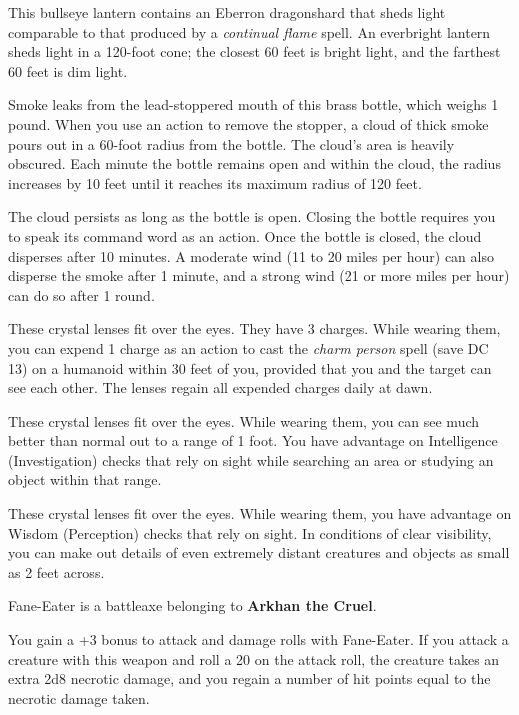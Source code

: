 \documentclass[10pt,a4paper,twoside,bg=print,twocolumn,openany,nodeprecatedcode]{dndbook}
\begin{document}
This bullseye lantern contains an Eberron dragonshard that sheds light comparable to that produced by a \textit{continual flame} spell. An everbright lantern sheds light in a 120-foot cone; the closest 60 feet is bright light, and the farthest 60 feet is dim light.

Smoke leaks from the lead-stoppered mouth of this brass bottle, which weighs 1 pound. When you use an action to remove the stopper, a cloud of thick smoke pours out in a 60-foot radius from the bottle. The cloud's area is heavily obscured. Each minute the bottle remains open and within the cloud, the radius increases by 10 feet until it reaches its maximum radius of 120 feet.

The cloud persists as long as the bottle is open. Closing the bottle requires you to speak its command word as an action. Once the bottle is closed, the cloud disperses after 10 minutes. A moderate wind (11 to 20 miles per hour) can also disperse the smoke after 1 minute, and a strong wind (21 or more miles per hour) can do so after 1 round.

These crystal lenses fit over the eyes. They have 3 charges. While wearing them, you can expend 1 charge as an action to cast the \textit{charm person} spell (save DC 13) on a humanoid within 30 feet of you, provided that you and the target can see each other. The lenses regain all expended charges daily at dawn.

These crystal lenses fit over the eyes. While wearing them, you can see much better than normal out to a range of 1 foot. You have advantage on Intelligence (Investigation) checks that rely on sight while searching an area or studying an object within that range.

These crystal lenses fit over the eyes. While wearing them, you have advantage on Wisdom (Perception) checks that rely on sight. In conditions of clear visibility, you can make out details of even extremely distant creatures and objects as small as 2 feet across.

Fane-Eater is a battleaxe belonging to \textbf{Arkhan the Cruel}.

You gain a +3 bonus to attack and damage rolls with Fane-Eater. If you attack a creature with this weapon and roll a 20 on the attack roll, the creature takes an extra 2d8 necrotic damage, and you regain a number of hit points equal to the necrotic damage taken.
\end{document}
